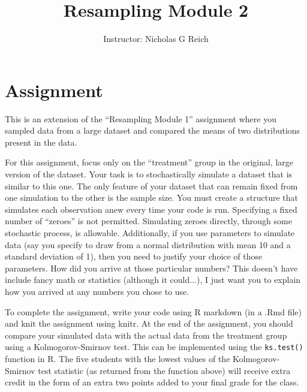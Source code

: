 \documentclass[11pt]{article}
\title{Resampling Module 2}
\author{%
        Instructor: Nicholas G Reich}
\date{}
\begin{document}
\maketitle


\section{Assignment}

This is an extension of the ``Resampling Module 1'' assignment where you sampled data from a large dataset and compared the means of two distributions present in the data.

For this assignment, focus only on the ``treatment'' group in the original, large version of the dataset.  Your task is to stochastically simulate a dataset that is similar to this one. The only feature of your dataset that can remain fixed from one simulation to the other is the sample size. You must create a structure that simulates each observation anew every time your code is run. Specifying a fixed number of ``zeroes'' is not permitted. Simulating zeroes directly, through some stochastic process, is allowable. Additionally, if you use parameters to simulate data (say you specify to draw from a normal distribution with mean 10 and a standard deviation of 1), then you need to justify your choice of those parameters. How did you arrive at those particular numbers? This doesn't have include fancy math or statistics (although it could...), I just want you to explain how you arrived at any numbers you chose to use. 

To complete the assignment, write your code using R markdown (in a .Rmd file) and knit the assignment using knitr. At the end of the assignment, you should compare your simulated data with the actual data from the treatment group using a Kolmogorov-Smirnov test. This can be implemented using the {\tt ks.test()} function in R. The five students with the lowest values of the Kolmogorov-Smirnov test statistic (as returned from the function above) will receive extra credit in the form of an extra two points added to your final grade for the class. %
\end{document}
